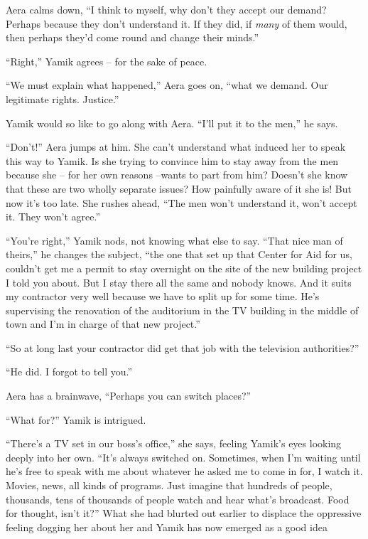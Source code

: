 \documentclass[twoside,11pt]{book}
\begin{document}
Aera calms down, ``I think to myself, why don't they accept our demand? Perhaps because they don't
understand it. If they did, if \textit{many} of them would, then perhaps they'd come round and change their
minds.''

``Right,'' Yamik agrees -- for the sake of peace.

``We must explain what happened,'' Aera goes on, ``what we demand. Our legitimate rights.
Justice.''

Yamik would so like to go along with Aera. ``I'll put it to the men,'' he says.

``Don't!'' Aera jumps at him. She can't understand what induced her to speak this way to
Yamik. Is she trying to convince him to stay away from the men because she -- for her own reasons --wants to part from
him? Doesn't she know that these are two wholly separate issues? How painfully aware of it she is! But now it's too
late. She rushes ahead, ``The men won't understand it, won't accept it.  They won't agree.''

``You're right,'' Yamik nods, not knowing what else to say. ``That nice man of
theirs,'' he changes the subject, ``the one that set up that Center for Aid for us, couldn't get me a permit to stay
overnight on the site of the new building project I told you about. But I stay there all the same and nobody knows. And
it suits my contractor very well because we have to split up for some time. He's supervising the renovation of the
auditorium in the TV building in the middle of town and I'm in charge of that new project.''

``So at long last your contractor did get that job with the television authorities?''

``He did. I forgot to tell you.''

Aera has a brainwave, ``Perhaps you can switch places?''

``What for?'' Yamik is intrigued.

``There's a TV set in our boss's office,'' she says, feeling Yamik's eyes looking deeply into
her own. ``It's always switched on. Sometimes, when I'm waiting until he's free to speak with me about
whatever he asked me to come in for, I watch it. Movies, news, all kinds of programs. Just imagine that hundreds of
people, thousands, tens of thousands of people watch and hear what's broadcast. Food for thought, isn't
it?'' What she had blurted out earlier to displace the oppressive feeling dogging her about her and Yamik
has now emerged as a good idea
\end{document}

